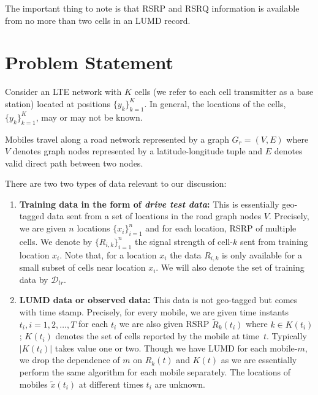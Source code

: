 \documentclass[conference, 10pt]{IEEEtran}
\newcommand{\abs}[1]{\lvert #1 \rvert}
\newcommand{\card}[1]{\abs{#1}}
\begin{document}
The important thing to note is that RSRP and RSRQ information is available from no
more than two cells in an LUMD record.





\section{Problem Statement} 
\label{sec:ps}

Consider an LTE network with $K$ cells (we refer to each cell transmitter as a
base station) located at positions $\{y_k\}_{k=1}^K$. In general, the locations
of the cells, $\{y_k\}_{k=1}^K$, may or may not be known.

Mobiles travel along a road network represented by a graph $G_r=(V,E)$ where $V$
denotes graph nodes represented by a latitude-longitude tuple and $E$ denotes
valid direct path between two nodes.

There are two two types of data relevant to our discussion:

\begin{enumerate}

\item \textbf{Training data in the form of {\em drive test data}:} This
is essentially geo-tagged data sent from a set of locations in
the road graph nodes $V$. Precisely, we are given $n$ locations
$\{x_i\}_{i=1}^n$ and for each location, RSRP of
multiple cells. We denote by $\{R_{i,k}\}_{i=1}^n$ the signal
strength of cell-$k$ sent from training location $x_i$. Note
that, for a location $x_i$ the data $R_{i,k}$ is only available
for a small subset of cells near location $x_i$. We will also denote the set of
training data by $\mathcal{D}_{tr}$.

\item \textbf{LUMD data or observed data:} This data is not geo-tagged but comes
with time stamp. Precisely, for every mobile, we are given time instants
$t_i, i=1,2,\hdots,T$ for each $t_i$ we are also given RSRP
${\tilde{R}}_k(t_i)$ where $k\in K(t_i)$; $K(t_i)$ denotes the set of cells reported by
the mobile at time~$t$. Typically $\card{K(t_i)}$ takes value one or two.
Though we have LUMD for each mobile-$m$, we drop the dependence of $m$
on $R_k(t)$ and $K(t)$ as we are essentially perform the same algorithm
for each mobile separately. The locations of mobiles $\tilde{x}(t_i)$ at different
times $t_i$ are unknown.
	
\end{enumerate} 
\end{document}
